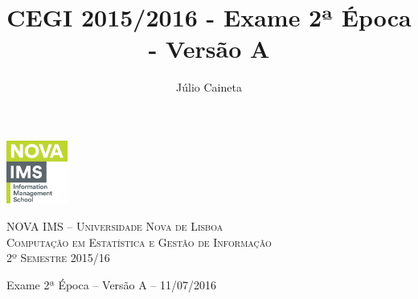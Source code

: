 \documentclass[addpoints]{exam}
\author{Júlio Caineta}
\title{CEGI 2015/2016 - Exame 2ª Época - Versão A}
\begin{document}
	
\noindent\begin{minipage}{0.2\textwidth}%
	\includegraphics[width=2cm]{logo.png}
\end{minipage}
\hfill
\begin{minipage}{0.8\textwidth}
	\begin{center}
		\textsc {\small NOVA IMS -- Universidade Nova de Lisboa} \\
		\textsc {Computação em Estatística e Gestão de Informação \\ 2º Semestre 2015/16}
	\end{center}
\end{minipage}

\begin{center}
	{\large Exame 2ª Época -- Versão A -- 11/07/2016}
\end{center}
 
\vspace{5mm}
\vspace{5mm}
\end{document}
